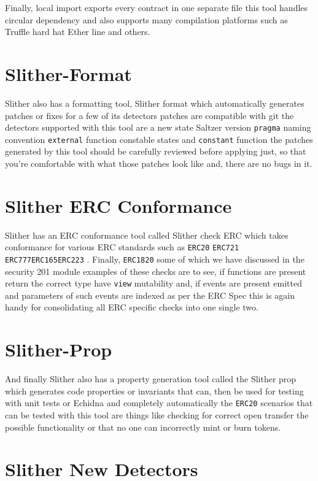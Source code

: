 Finally, local import exports every contract in one separate file this tool handles circular dependency and also supports many compilation platforms such as Truffle hard hat Ether line and others.

\section{Slither-Format}

Slither also has a formatting tool, Slither format which automatically generates patches or fixes for a few of its detectors patches are compatible with git the detectors supported with this tool are a new state Saltzer version \verb|pragma| naming convention \verb|external| function constable states and \verb|constant| function the patches generated by this tool should be carefully reviewed before applying just, so that you're comfortable with what those patches look like and, there are no bugs in it.

\section{Slither ERC Conformance}

Slither has an ERC conformance tool called Slither check ERC which takes conformance for various ERC standards such as \verb|ERC20| \verb|ERC721| \verb|ERC777|\verb|ERC165|\verb|ERC223| . Finally, \verb|ERC1820| some of which we have discussed in the security 201 module examples of these checks are to see, if functions are present return the correct type have \verb|view| mutability and, if events are present emitted and parameters of such events are indexed as per the ERC Spec this is again handy for consolidating all ERC specific checks into one single two.

\section{Slither-Prop}

And finally Slither also has a property generation tool called the Slither prop which generates code properties or invariants that can, then be used for testing with unit tests or Echidna and completely automatically the \verb|ERC20| scenarios that can be tested with this tool are things like checking for correct open transfer the possible functionality or that no one can incorrectly mint or burn tokens.

\section{Slither New Detectors}

